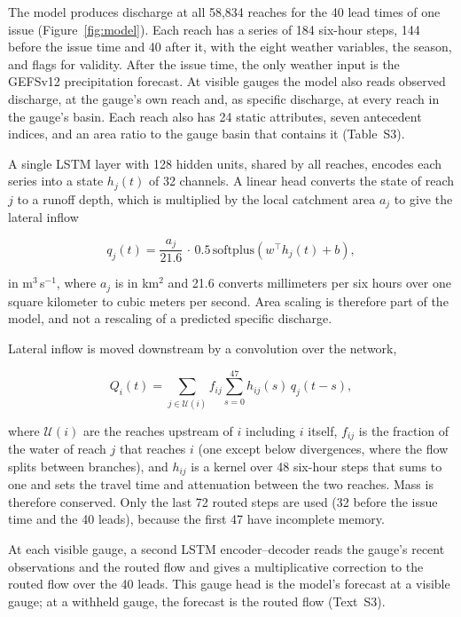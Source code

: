 \documentclass[draft]{agujournal2019}
\begin{document}
The model produces discharge at all 58,834 reaches for the 40 lead times of one issue (Figure~\ref{fig:model}). Each reach has a series of 184 six-hour steps, 144 before the issue time and 40 after it, with the eight weather variables, the season, and flags for validity. After the issue time, the only weather input is the GEFSv12 precipitation forecast. At visible gauges the model also reads observed discharge, at the gauge's own reach and, as specific discharge, at every reach in the gauge's basin. Each reach also has 24 static attributes, seven antecedent indices, and an area ratio to the gauge basin that contains it (Table~S3).

A single LSTM layer \cite{Hochreiter1997} with 128 hidden units, shared by all reaches, encodes each series into a state $h_j(t)$ of 32 channels. A linear head converts the state of reach $j$ to a runoff depth, which is multiplied by the local catchment area $a_j$ to give the lateral inflow
\begin{linenomath*}
\begin{equation}
q_j(t) = \frac{a_j}{21.6}\,\cdot\,0.5\,\mathrm{softplus}\!\left(w^{\top}h_j(t) + b\right),
\label{eq:inflow}
\end{equation}
\end{linenomath*}
in m$^3$\,s$^{-1}$, where $a_j$ is in km$^2$ and 21.6 converts millimeters per six hours over one square kilometer to cubic meters per second. Area scaling is therefore part of the model, and not a rescaling of a predicted specific discharge.

Lateral inflow is moved downstream by a convolution over the network,
\begin{linenomath*}
\begin{equation}
Q_i(t) = \sum_{j \in \mathcal{U}(i)} f_{ij} \sum_{s=0}^{47} h_{ij}(s)\, q_j(t-s),
\label{eq:route}
\end{equation}
\end{linenomath*}
where $\mathcal{U}(i)$ are the reaches upstream of $i$ including $i$ itself, $f_{ij}$ is the fraction of the water of reach $j$ that reaches $i$ (one except below divergences, where the flow splits between branches), and $h_{ij}$ is a kernel over 48 six-hour steps that sums to one and sets the travel time and attenuation between the two reaches. Mass is therefore conserved. Only the last 72 routed steps are used (32 before the issue time and the 40 leads), because the first 47 have incomplete memory.

At each visible gauge, a second LSTM encoder--decoder reads the gauge's recent observations and the routed flow and gives a multiplicative correction to the routed flow over the 40 leads. This gauge head is the model's forecast at a visible gauge; at a withheld gauge, the forecast is the routed flow (Text~S3).
\end{document}
